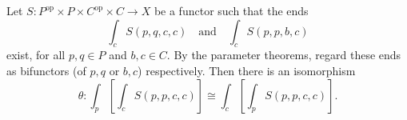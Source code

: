 Let $S: P^{\mathrm{op}} \times P \times C^{\mathrm{op}} \times C \to X$ be a functor such that the ends
$$\int_c S(p, q, c, c) \quad\text{and}\quad \int_c S(p, p, b, c)$$
exist, for all $p, q \in P$ and $b, c \in C$. By the parameter theorems, regard these ends as bifunctors (of $p, q$ or $b, c$) respectively. Then there is an isomorphism
$$\theta: \int_p \left[ \int_c S(p, p, c, c) \right] \cong \int_c \left[ \int_p S(p, p, c, c) \right].$$
